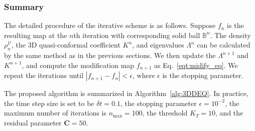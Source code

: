 \documentclass{article}
\begin{document}
\subsubsection{Summary}
The detailed procedure of the iterative scheme is as follows. Suppose $f_n$ is the resulting map at the $n$th iteration with corresponding solid ball $\mathbb{B}^n$. The density $\rho_n^{\mathcal{V}}$, the 3D quasi-conformal coefficient $K^n$, and eigenvalues $\Lambda^n$  can be calculated by the same method as in the previous sections. We then update the $\Lambda^{n+1}$ and $K^{n+1}$, and compute the modification map $f_{n+1}$ as Eq.~\eqref{eqt:midify_eq}. We repeat the iterations until $|f_{n+1} - f_n|< \epsilon$, where $\epsilon$ is the stopping parameter.

The proposed algorithm is summarized in Algorithm~\ref{alg:3DDEQ}. In practice, the time step size is set to be $\delta t = 0.1$, the stopping parameter $\epsilon = 10^{-2}$, the maximum number of iterations is $n_{\text{max}} = 100$, the threshold $K_T = 10$, and the residual parameter $\mathbf{C} = 50 $.
\end{document}

